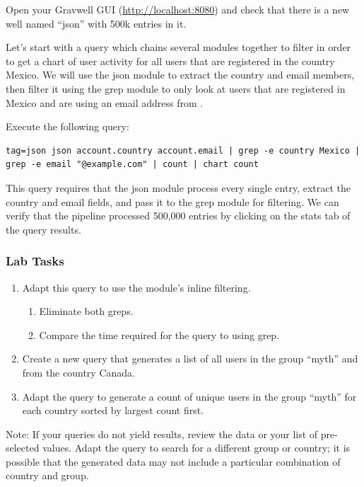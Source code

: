 Open your Gravwell GUI (\href{http://localhost:8080}{http://localhost:8080}) and check
that there is a new well named ``json'' with 500k entries in it.

Let's start with a query which chains several modules together to
filter in order to get a chart of user activity for all users that are
registered in the country Mexico. We will use the json module to
extract the country and email members, then filter it using the grep
module to only look at users that are registered in Mexico and are using
an email address from .

Execute the following query:

\begin{Verbatim}[breaklines=true]
tag=json json account.country account.email | grep -e country Mexico |
grep -e email "@example.com" | count | chart count
\end{Verbatim}

This query requires that the json module process every single entry,
extract the country and email fields, and pass it to the grep module
for filtering. We can verify that the pipeline processed 500,000
entries by clicking on the stats tab of the query results.

\subsubsection{Lab Tasks}

\begin{enumerate}
\item
  Adapt this query to use the  module's inline filtering.
	\begin{enumerate}
	\item Eliminate both greps.
	\item Compare the time required for the query to using grep.
	\end{enumerate}
\item
  Create a new query that generates a list of all users in the group
  ``myth'' and from the country Canada.
\item
  Adapt the query to generate a count of unique users in the
  group ``myth'' for each country sorted by largest count first.
\end{enumerate}

Note: If your queries do not yield results, review the data or your list
of pre-selected values. Adapt the query to search for a different group or country;
it is possible that the generated data may not include a particular combination
of country and group.

